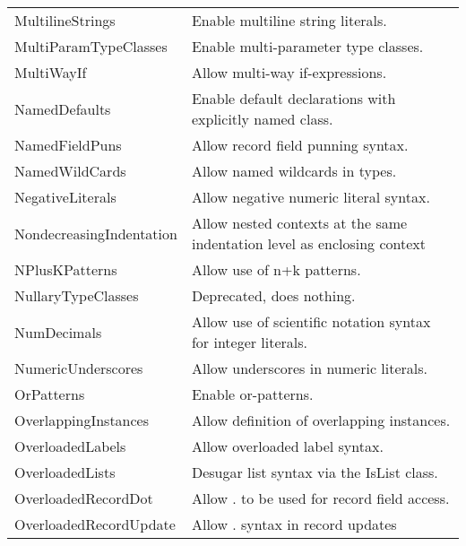 \documentclass[openany, 12pt]{book}
\begin{document}
\begin{longtable}{ll}
	MultilineStrings           & Enable multiline string literals.                                          \\
	MultiParamTypeClasses      & Enable multi-parameter type classes.                                       \\
	MultiWayIf                 & Allow multi-way if-expressions.                                            \\
	NamedDefaults              & Enable default declarations with explicitly named class.                   \\
	NamedFieldPuns             & Allow record field punning syntax.                                         \\
	NamedWildCards             & Allow named wildcards in types.                                            \\
	NegativeLiterals           & Allow negative numeric literal syntax.                                     \\
	NondecreasingIndentation   & Allow nested contexts at the same indentation level as enclosing context   \\
	NPlusKPatterns             & Allow use of n+k patterns.                                                 \\
	NullaryTypeClasses         & Deprecated, does nothing.                                                  \\
	NumDecimals                & Allow use of scientific notation syntax for integer literals.              \\
	NumericUnderscores         & Allow underscores in numeric literals.                                     \\
	OrPatterns                 & Enable or-patterns.                                                        \\
	OverlappingInstances       & Allow definition of overlapping instances.                                 \\
	OverloadedLabels           & Allow overloaded label syntax.                                             \\
	OverloadedLists            & Desugar list syntax via the IsList class.                                  \\
	OverloadedRecordDot        & Allow . to be used for record field access.                                \\
	OverloadedRecordUpdate     & Allow . syntax in record updates                                           \\

\end{longtable}
\end{document}
